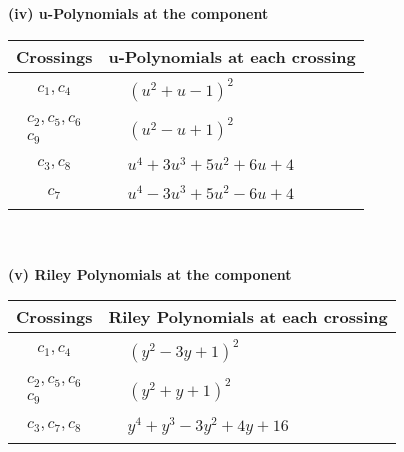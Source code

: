 \documentclass[1p]{elsarticle_modified}
\theoremstyle{definition}
\begin{document}
\newpage\renewcommand{\arraystretch}{1}
\flushleft \textbf{(iv) u-Polynomials at the component}\newline \\
\begin{tabular}{m{50pt}|m{274pt}}
Crossings & \hspace{64pt}u-Polynomials at each crossing \\
\hline $$\begin{aligned}c_{1},c_{4}\end{aligned}$$&$\begin{aligned}
&(u^2+u-1)^2
\end{aligned}$\\
\hline $$\begin{aligned}c_{2},c_{5},c_{6}\\c_{9}\end{aligned}$$&$\begin{aligned}
&(u^2- u+1)^2
\end{aligned}$\\
\hline $$\begin{aligned}c_{3},c_{8}\end{aligned}$$&$\begin{aligned}
&u^4+3 u^3+5 u^2+6 u+4
\end{aligned}$\\
\hline $$\begin{aligned}c_{7}\end{aligned}$$&$\begin{aligned}
&u^4-3 u^3+5 u^2-6 u+4
\end{aligned}$\\
\hline
\end{tabular}\\~\\
\newpage\renewcommand{\arraystretch}{1}
\flushleft \textbf{(v) Riley Polynomials at the component}\newline \\
\begin{tabular}{m{50pt}|m{274pt}}
Crossings & \hspace{64pt}Riley Polynomials at each crossing \\
\hline $$\begin{aligned}c_{1},c_{4}\end{aligned}$$&$\begin{aligned}
&(y^2-3 y+1)^2
\end{aligned}$\\
\hline $$\begin{aligned}c_{2},c_{5},c_{6}\\c_{9}\end{aligned}$$&$\begin{aligned}
&(y^2+y+1)^2
\end{aligned}$\\
\hline $$\begin{aligned}c_{3},c_{7},c_{8}\end{aligned}$$&$\begin{aligned}
&y^4+y^3-3 y^2+4 y+16
\end{aligned}$\\
\hline
\end{tabular}\\~\\
\end{document}
